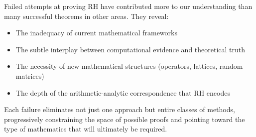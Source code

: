 \begin{philosophical}
Failed attempts at proving RH have contributed more to our understanding than many successful theorems in other areas. They reveal:
\begin{itemize}
\item The inadequacy of current mathematical frameworks
\item The subtle interplay between computational evidence and theoretical truth
\item The necessity of new mathematical structures (operators, lattices, random matrices)
\item The depth of the arithmetic-analytic correspondence that RH encodes
\end{itemize}
Each failure eliminates not just one approach but entire classes of methods, progressively constraining the space of possible proofs and pointing toward the type of mathematics that will ultimately be required.
\end{philosophical}